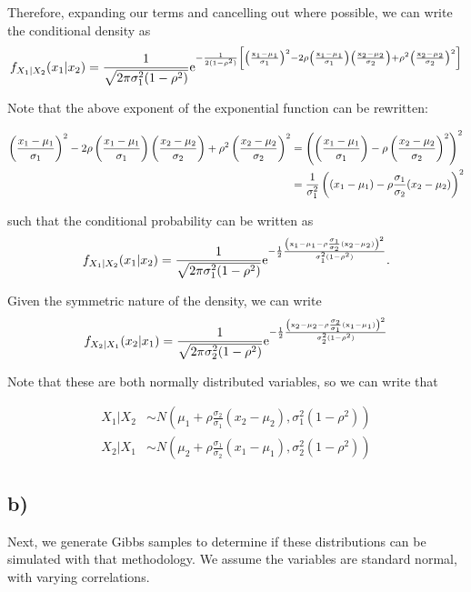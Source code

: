 \documentclass[]{article}
\begin{document}
Therefore, expanding our terms and cancelling out where possible, we can
write the conditional density as \[
f_{X_1|X_2}(x_1 | x_2) = \frac{1}{\sqrt{2\pi\sigma_1^2(1-\rho^2)}} \rm{e}^
{-\frac{1}{2(1-\rho^2)}\left[
\left(\frac{x_{1} - \mu_{1}}{\sigma_{1}} \right)^2 - 2 \rho \left(\frac{x_{1} - \mu_{1}}{\sigma_{1}} \right)\left(\frac{x_{2} - \mu_{2}}{\sigma_{2}} \right) + \rho^2 \left(\frac{x_{2} - \mu_{2}}{\sigma_{2}} \right)^2
\right] }
\]

Note that the above exponent of the exponential function can be
rewritten:

\begin{align*}
\left(\frac{x_{1} - \mu_{1}}{\sigma_{1}} \right)^2 - 2 \rho \left(\frac{x_{1} - \mu_{1}}{\sigma_{1}} \right)\left(\frac{x_{2} - \mu_{2}}{\sigma_{2}} \right) + \rho^2 \left(\frac{x_{2} - \mu_{2}}{\sigma_{2}} \right)^2 &= 
\left(
\left(\frac{x_{1} - \mu_{1}}{\sigma_{1}} \right) - \rho\left(\frac{x_{2} - \mu_{2}}{\sigma_{2}} \right)^2
\right)^2 \\ 
&= \frac{1}{\sigma_1^2}\left((x_1 - \mu_1) - \rho \frac{\sigma_1}{\sigma_2}(x_2 - \mu_2)\right)^2
\end{align*}

such that the conditional probability can be written as \[
f_{X_1|X_2}(x_1 | x_2) = 
\frac{1}{\sqrt{2\pi\sigma_1^2(1-\rho^2)}} \rm{e}^{
-\frac{1}{2}
\frac{\left(x_1 - \mu_1 - \rho \frac{\sigma_1}{\sigma_2}(x_2 - \mu_2)\right)^2}{\sigma_1^2(1-\rho^2)}
}.
\]

Given the symmetric nature of the density, we can write \[
f_{X_2|X_1}(x_2 | x_1)=
\frac{1}{\sqrt{2\pi\sigma_2^2(1-\rho^2)}} \rm{e}^{
-\frac{1}{2}
\frac{\left(x_2 - \mu_2 - \rho \frac{\sigma_2}{\sigma_1}(x_1 - \mu_1)\right)^2}{\sigma_2^2(1-\rho^2)}
}
\]

Note that these are both normally distributed variables, so we can write
that

\begin{align*}
X_1 | X_2 &\sim N(\mu_1 + \rho \frac{\sigma_2}{\sigma_1}(x_2 - \mu_2), \sigma_1^2(1 - \rho^2)) \\
X_2 | X_1 &\sim N(\mu_2 + \rho \frac{\sigma_1}{\sigma_2}(x_1 - \mu_1), \sigma_2^2(1 - \rho^2))
\end{align*}

\subsection{b)}\label{b-1}

Next, we generate Gibbs samples to determine if these distributions can
be simulated with that methodology. We assume the variables are standard
normal, with varying correlations.
\end{document}
